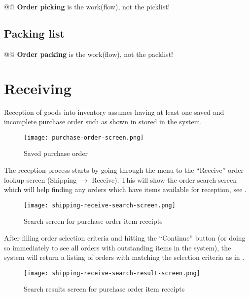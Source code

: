 @@ \textbf{Order picking} is the work(flow), not the picklist!

\subsection{Packing list}
\label{subsec-workflows-inventory-shipping-packlist}

@@ \textbf{Order packing} is the work(flow), not the packlist!

\section{Receiving}
\label{sec-workflows-inventory-receiving}


Reception of goods into inventory assumes having at least one
saved and incomplete purchase order such as shown in
 stored in the system.

\begin{figure}[h]
\centering
\texttt{[image: purchase-order-screen.png]}
\caption{Saved purchase order}
\label{fig:purchase-order-screen}
\end{figure}

The reception process starts by going through the menu to the
``Receive'' order lookup screen (Shipping $\rightarrow$ Receive).
This will show the order search screen which will help finding
any orders which have items available for reception, see .


\begin{figure}[h]
\centering
\texttt{[image: shipping-receive-search-screen.png]}
\caption{Search screen for purchase order item receipts}
\label{fig:shipping-receive-search-screen}
\end{figure}

After filling order selection criteria and hitting the ``Continue'' button (or doing so
immediately to see all orders with outstanding items in the system), the system will return
a listing of orders with matching the selection criteria as in .

\begin{figure}[h]
\centering
\texttt{[image: shipping-receive-search-result-screen.png]}
\caption{Search results screen for purchase order item receipts}
\label{fig:shipping-receive-search-result-screen}
\end{figure}


